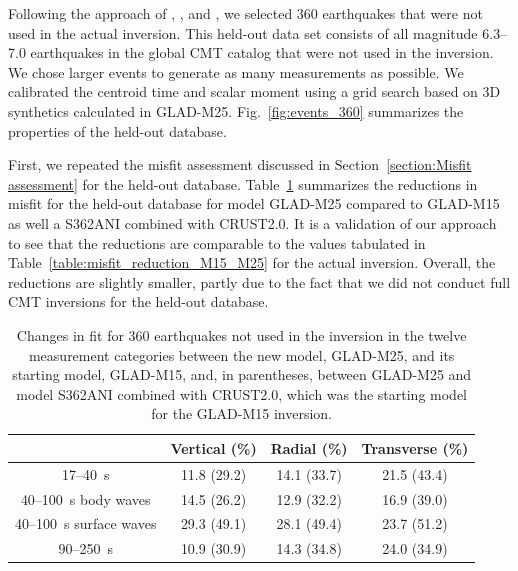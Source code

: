 \documentclass[extra,mreferee]{gji}
\begin{document}
Following the approach of \cite{tape2009adjoint}, \cite{chen2015multiparameter},
and \cite{bozdaug2016global}, we selected 360 earthquakes that were not used
in the actual inversion. This held-out data set consists of all magnitude 6.3--7.0
earthquakes in the global CMT catalog that were not used in the inversion.
We chose larger events to generate as many measurements as possible.
We calibrated the centroid time and scalar moment using a grid search based on
3D synthetics calculated in GLAD-M25.
Fig.~\ref{fig:events_360} summarizes the properties of the held-out database.

First, we repeated the misfit assessment discussed in
Section~\ref{section:Misfit assessment} for the held-out database.
Table~\ref{table:misfit_reduction_M15_M25_360} summarizes the reductions
in misfit for the held-out database for model GLAD-M25 compared to GLAD-M15
as well a S362ANI combined with CRUST2.0.
It is a validation of our approach to see that the reductions are comparable to the
values tabulated in Table~\ref{table:misfit_reduction_M15_M25} for the actual inversion.
Overall, the reductions are slightly smaller, partly due to the fact that we did not
conduct full CMT inversions for the held-out database.

\begin{table}
  \centering
  \begin{tabular}{|c|c|c|c|}
  \hline
  ~          &  Vertical (\%) & Radial (\%) &  Transverse (\%) \\
  \hline
  17--40~s                &          11.8 (29.2) &       14.1 (33.7) &       21.5 (43.4) \\
  40--100~s body waves    &          14.5 (26.2) &       12.9 (32.2)  &       16.9 (39.0) \\
  40--100~s surface waves &          29.3 (49.1) &       28.1 (49.4) &       23.7 (51.2) \\
  90--250~s               &          10.9 (30.9) &       14.3 (34.8)  &       24.0 (34.9) \\
  \hline
  \end{tabular}\\
  \caption{\small{Changes in fit for 360 earthquakes not used in the inversion in the twelve measurement categories
between the new model, GLAD-M25, and its starting model, GLAD-M15, and, in parentheses, between GLAD-M25 and model S362ANI combined with CRUST2.0, which was the starting model for the GLAD-M15 inversion.}}
  \label{table:misfit_reduction_M15_M25_360}
\end{table}
\end{document}
